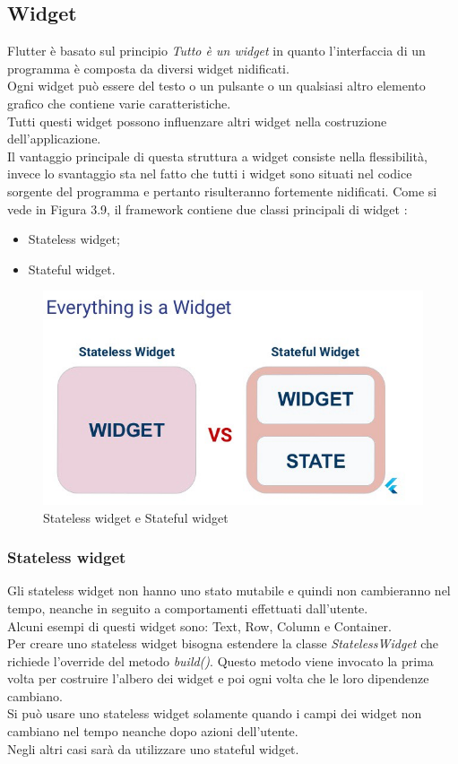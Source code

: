\subsection{Widget}
\label{sec:Widget}
Flutter è basato sul principio \textit{Tutto è un widget} \cite{flutterprogramma} in quanto l'interfaccia di un programma è composta da diversi widget nidificati.\\
Ogni widget può essere del testo o un pulsante o un qualsiasi altro elemento grafico che contiene varie caratteristiche.\\
Tutti questi widget possono influenzare altri widget nella costruzione dell'applicazione.\\
Il vantaggio principale di questa struttura a widget consiste nella flessibilità, invece lo svantaggio sta nel fatto che tutti i widget sono situati nel codice sorgente del programma e pertanto risulteranno fortemente nidificati.
\newpage
Come si vede in Figura 3.9, il framework contiene due classi principali di widget \cite{ flutterd, state}: 
\begin{itemize}
	\item Stateless widget;   
	\item Stateful widget.
\end{itemize}

\begin{figure}[htbp]	
	\centering
	\includegraphics[width=12cm]{immagini/state.jpeg}
	\caption{Stateless widget e Stateful widget \cite{state}}
	\label{fig:Stateless widget e Stateful widget}
\end{figure}
\subsubsection{Stateless widget}
Gli stateless widget non hanno uno stato mutabile e quindi non cambieranno nel tempo, neanche in seguito a comportamenti effettuati dall'utente.\\
Alcuni esempi di questi widget sono: Text, Row, Column e Container.\\
Per creare uno stateless widget bisogna estendere la classe \textit{StatelessWidget} che richiede l'override del metodo \textit{build()}.
Questo metodo viene invocato la prima volta per costruire l'albero dei widget e poi ogni volta che le loro dipendenze cambiano.\\
Si può usare uno stateless widget solamente quando i campi dei widget non cambiano nel tempo neanche dopo azioni dell'utente.\\
Negli altri casi sarà da utilizzare uno stateful widget.

